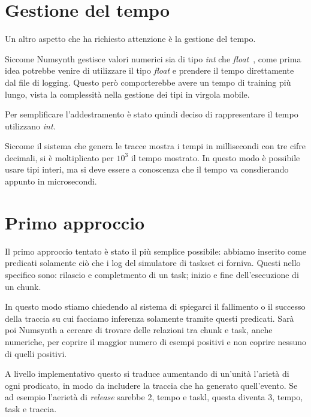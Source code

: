 \section{Gestione del tempo}
Un altro aspetto che ha richiesto attenzione è la gestione del tempo.

Siccome Numsynth gestisce valori numerici sia di tipo \textit{int} che \textit{float}~\cite{numsynth}, come prima idea potrebbe venire di utilizzare il tipo \textit{float} e prendere il tempo direttamente dal file di logging. Questo però comporterebbe avere un tempo di training più lungo, vista la complessità nella gestione dei tipi in virgola mobile.

\myskip

Per semplificare l'addestramento è stato quindi deciso di rappresentare il tempo utilizzano \textit{int}.

Siccome il sistema che genera le tracce mostra i tempi in millisecondi con tre cifre decimali, si è moltiplicato per $10^3$ il tempo mostrato. In questo modo è possibile usare tipi interi, ma si deve essere a conoscenza che il tempo va consdierando appunto in microsecondi.

\section{Primo approccio}
Il primo approccio tentato è stato il più semplice possibile: abbiamo inserito come predicati solamente ciò che i log del simulatore di taskset ci forniva. Questi nello specifico sono: rilascio e completmento di un task; inizio e fine dell'esecuzione di un chunk.

In questo modo stiamo chiedendo al sistema di spiegarci il fallimento o il successo della traccia su cui facciamo inferenza solamente tramite questi predicati. Sarà poi Numsynth a cercare di trovare delle relazioni tra chunk e task, anche numeriche, per coprire il maggior numero di esempi positivi e non coprire nessuno di quelli positivi.

A livello implementativo questo si traduce aumentando di un'unità l'arietà di ogni prodicato, in modo da includere la traccia che ha generato quell'evento. Se ad esempio l'aerietà di \textit{release} sarebbe 2, tempo e taskl, questa diventa 3, tempo, task e traccia.
